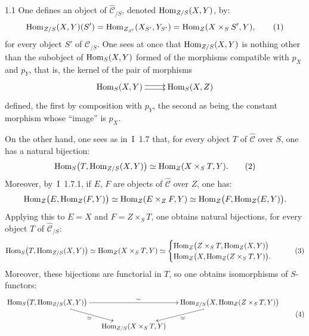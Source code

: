\begin{definition}{1.1}
\label{II.1.1}
One defines an object of \(\widehat{\mathcal{C}}_{/S}\), denoted
\(\operatorname{Hom}_{Z/S}(X,Y)\), by:
\begin{equation}
\operatorname{Hom}_{Z/S}(X,Y)(S')
=\operatorname{Hom}_{Z_{S'}}(X_{S'},Y_{S'})
=\operatorname{Hom}_Z(X\times_S S',Y),
\tag{1}
\end{equation}
for every object \(S'\) of \(\mathcal{C}_{/S}\). One sees at once that
\(\operatorname{Hom}_{Z/S}(X,Y)\) is nothing other than the subobject of
\(\operatorname{Hom}_S(X,Y)\) formed of the morphisms compatible with \(p_X\) and \(p_Y\),
that is, the kernel of the pair of morphisms
\[
\xymatrix{
\Hom_S(X,Y) \ar@<0.5ex>[r] \ar@<-0.5ex>[r] & \Hom_S(X,Z)
}
\]
defined, the first by composition with \(p_Y\), the second as being the
constant morphism whose ``image'' is \(p_X\).

{\renewcommand{\thefootnote}{(2)}}%
On the other hand, one sees as in~I~1.7 that, for every object \(T\) of
\(\widehat{\mathcal{C}}\) over \(S\), one has a natural bijection:
\begin{equation}
\operatorname{Hom}_S\bigl(T,\operatorname{Hom}_{Z/S}(X,Y)\bigr)
\simeq
\operatorname{Hom}_Z(X\times_S T,Y).
\tag{2}
\end{equation}
Moreover, by~I~1.7.1, if \(E\), \(F\) are objects of \(\widehat{\mathcal{C}}\)
over \(Z\), one has:
\[
\operatorname{Hom}_Z\bigl(E,\operatorname{Hom}_Z(F,Y)\bigr)
\simeq
\operatorname{Hom}_Z(E\times_Z F,Y)
\simeq
\operatorname{Hom}_Z\bigl(F,\operatorname{Hom}_Z(E,Y)\bigr).
\]
Applying this to \(E=X\) and \(F=Z\times_S T\), one obtains natural
bijections, for every object \(T\) of \(\widehat{\mathcal{C}}_{/S}\):
\begin{equation}
\operatorname{Hom}_S\bigl(T,\operatorname{Hom}_{Z/S}(X,Y)\bigr)
\simeq
\operatorname{Hom}_Z(X\times_S T,Y)
\simeq
\begin{cases}
\operatorname{Hom}_Z\bigl(Z\times_S T,\operatorname{Hom}_Z(X,Y)\bigr)\\
\operatorname{Hom}_Z\bigl(X,\operatorname{Hom}_Z(Z\times_S T,Y)\bigr).
\end{cases}
\tag{3}
\end{equation}
Moreover, these bijections are functorial in \(T\), so one obtains
isomorphisms of \(S\)-functors:
\begin{equation}
\vcenter{\xymatrix@C=1.4em@R=1.6em{
\Hom_S\bigl(T,\Hom_{Z/S}(X,Y)\bigr)
  \ar[rr]^{\sim} \ar[dr]_{\simeq}
&&
\Hom_{Z/S}\bigl(X,\Hom_Z(Z\times_S T,Y)\bigr)
  \ar[dl]^{\simeq}
\\
& \Hom_{Z/S}(X\times_S T,Y) &
}}
\tag{4}
\end{equation}


\end{definition}
